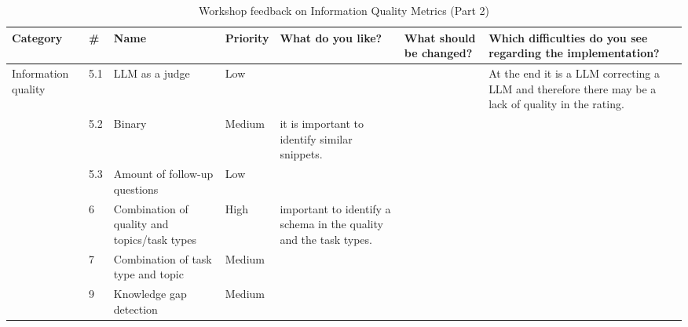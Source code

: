 \documentclass[
	english,
	ruledheaders=section,%
	class=report,%
	thesis={type=bachelor},%
	accentcolor=1b,%
	custommargins=true,%
	marginpar=false,%
	parskip=half-,%
	fontsize=11pt,%
	DIV=14,
]{tudapub}
\begin{document}
\begin{table}
    \centering
    \small 
    \caption{Workshop feedback on Information Quality Metrics (Part 2)}
    \label{tab:info_quality_p2}
    \begin{tabularx}{\textheight}{p{2.2cm} l >{\RaggedRight\arraybackslash}X l >{\RaggedRight\arraybackslash}X >{\RaggedRight\arraybackslash}X >{\RaggedRight\arraybackslash}X}
        \toprule
        \textbf{Category} & \textbf{\#} & \textbf{Name} & \textbf{Priority} & \textbf{What do you like?} & \textbf{What should be changed?} & \textbf{Which difficulties do you see regarding the implementation?} \\
        \midrule
        \multirow{6}{=}{Information quality} 
        & 5.1 & LLM as a judge & Low & & & At the end it is a LLM correcting a LLM and therefore there may be a lack of quality in the rating. \\
        \cmidrule(l){2-7}
        & 5.2 & Binary & Medium & it is important to identify similar snippets. & & \\
        \cmidrule(l){2-7}
        & 5.3 & Amount of follow-up questions & Low & & & \\
        \cmidrule(l){2-7}
        & 6 & Combination of quality and topics/task types & High & important to identify a schema in the quality and the task types. & & \\
        \cmidrule(l){2-7}
        & 7 & Combination of task type and topic & Medium & & & \\
        \cmidrule(l){2-7}
        & 9 & Knowledge gap detection & Medium & & & \\
        \bottomrule
    \end{tabularx}
\end{table}
\end{document}
